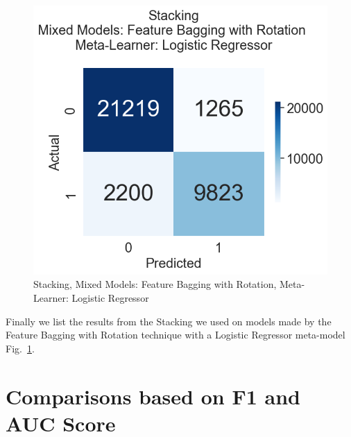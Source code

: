 \documentclass[a4paper,12pt]{report}
\theoremstyle{definitionNODot}
\begin{document}
	\begin{figure}[H]
		\centering
		\includegraphics[width=\textwidth/2]{anomaly_by_logistic_regression_mixed_models.png}
		\caption{Stacking, Mixed Models: Feature Bagging with Rotation, Meta-Learner: Logistic Regressor}
		\label{fig:anomaly_by_logistic_regression_mixed_models}
	\end{figure}
	
	Finally we list the results from the Stacking we used on models made by the Feature Bagging with Rotation technique with a Logistic Regressor meta-model Fig.~\ref{fig:anomaly_by_logistic_regression_mixed_models}.
	
	\section{Comparisons based on F1 and AUC Score}
	
\end{document}
